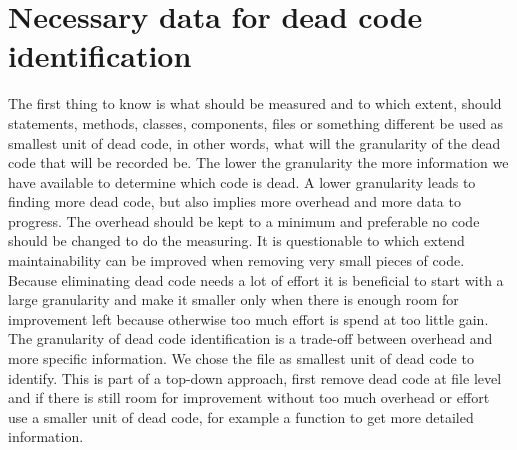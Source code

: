 \section{Necessary data for dead code identification}

The first thing to know is what should be measured and to which extent, should statements, methods, classes, components, files or something different be used as smallest unit of dead code, in other words, what will the granularity of the dead code that will be recorded be. The lower the granularity the more information we have available to determine which code is dead. A lower granularity leads to finding more dead code, but also implies more overhead and more data to progress. The overhead should be kept to a minimum and preferable no code should be changed to do the measuring. It is questionable to which extend maintainability can be improved when removing very small pieces of code. Because eliminating dead code needs a lot of effort\cite{andreopoulos2004,jones2006} it is beneficial to start with a large granularity and make it smaller only when there is enough room for improvement left because otherwise too much effort is spend at too little gain. The granularity of dead code identification is a trade-off between overhead and more specific information. We chose the file as smallest unit of dead code to identify. This is part of a top-down approach, first remove dead code at file level and if there is still room for improvement without too much overhead or effort use a smaller unit of dead code, for example a function to get more detailed information.

